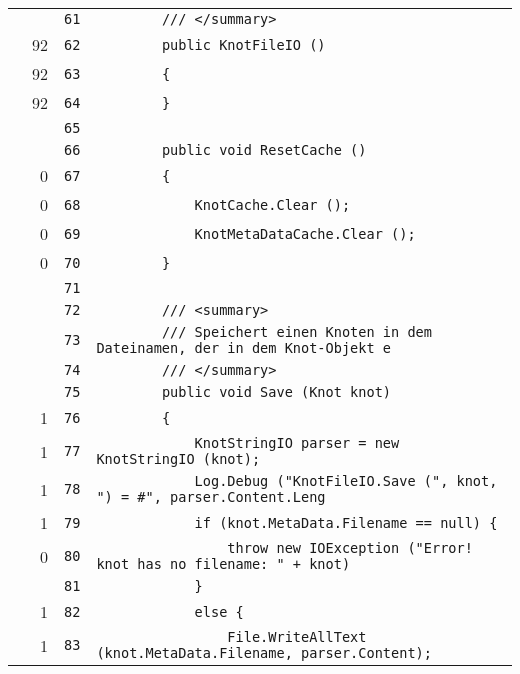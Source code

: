 \documentclass[a4paper,10pt]{article}
\begin{document}
\begin{longtable}[l]{lrrl}
\cellcolor{gray} &  & \verb~61~ & \verb~        /// </summary>~\\
\cellcolor{green} & 92 & \verb~62~ & \verb~        public KnotFileIO ()~\\
\cellcolor{green} & 92 & \verb~63~ & \verb~        {~\\
\cellcolor{green} & 92 & \verb~64~ & \verb~        }~\\
\cellcolor{gray} &  & \verb~65~ & \verb~~\\
\cellcolor{gray} &  & \verb~66~ & \verb~        public void ResetCache ()~\\
\cellcolor{red} & 0 & \verb~67~ & \verb~        {~\\
\cellcolor{red} & 0 & \verb~68~ & \verb~            KnotCache.Clear ();~\\
\cellcolor{red} & 0 & \verb~69~ & \verb~            KnotMetaDataCache.Clear ();~\\
\cellcolor{red} & 0 & \verb~70~ & \verb~        }~\\
\cellcolor{gray} &  & \verb~71~ & \verb~~\\
\cellcolor{gray} &  & \verb~72~ & \verb~        /// <summary>~\\
\cellcolor{gray} &  & \verb~73~ & \verb~        /// Speichert einen Knoten in dem Dateinamen, der in dem Knot-Objekt e~\\
\cellcolor{gray} &  & \verb~74~ & \verb~        /// </summary>~\\
\cellcolor{gray} &  & \verb~75~ & \verb~        public void Save (Knot knot)~\\
\cellcolor{green} & 1 & \verb~76~ & \verb~        {~\\
\cellcolor{green} & 1 & \verb~77~ & \verb~            KnotStringIO parser = new KnotStringIO (knot);~\\
\cellcolor{green} & 1 & \verb~78~ & \verb~            Log.Debug ("KnotFileIO.Save (", knot, ") = #", parser.Content.Leng~\\
\cellcolor{green} & 1 & \verb~79~ & \verb~            if (knot.MetaData.Filename == null) {~\\
\cellcolor{red} & 0 & \verb~80~ & \verb~                throw new IOException ("Error! knot has no filename: " + knot)~\\
\cellcolor{gray} &  & \verb~81~ & \verb~            }~\\
\cellcolor{green} & 1 & \verb~82~ & \verb~            else {~\\
\cellcolor{green} & 1 & \verb~83~ & \verb~                File.WriteAllText (knot.MetaData.Filename, parser.Content);~\\

\end{longtable}
\end{document}
